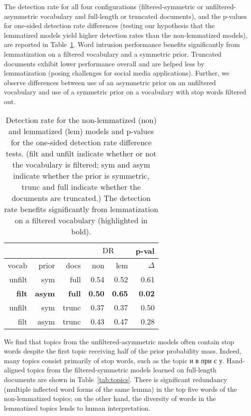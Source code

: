 \documentclass{clv2}
\newcommand{\DR}{\ensuremath{\textrm{DR}}}
\begin{document}
The detection rate for all four configurations (filtered-symmetric or unfiltered-asymmetric
vocabulary and full-length or truncated documents), and the
p-values for one-sided detection rate differences (testing our
hypothesis that the lemmatized models yield higher detection rates than
the non-lemmatized models), are reported in
Table~\ref{tab:detection-rate}.  Word intrusion performance benefits
significantly from lemmatization on a filtered vocabulary and a
symmetric prior.
Truncated documents exhibit lower
performance overall and are helped less by lemmatization (posing
challenges for social media applications).
Further, we observe differences
between use of an asymmetric prior on an unfiltered vocabulary and
use of a symmetric prior on a vocabulary with stop words filtered out.

\begin{table}
  \centering
    \begin{tabular}{rrr|rr|r}
              &              &                & \multicolumn{2}{|c|}{$\DR$} &       p-val   \\\hline
        vocab & prior        & docs           & non         & lem         &         $\Delta$ \\\hline
        unfilt & sym         & full           &          0.54 &          0.52 &          0.61 \\
        \textbf{filt} & \textbf{asym} & \textbf{full} & \textbf{0.50} & \textbf{0.65} & \textbf{0.02} \\
        unfilt & sym         & trunc          &          0.37 &          0.37 &          0.50 \\
        filt & asym          & trunc          &          0.43 &          0.47 &          0.28 \\
    \end{tabular}
    \caption{Detection rate for the non-lemmatized (non) and
        lemmatized (lem) models
        and p-values for the one-sided detection rate difference tests.
        (filt and unfilt indicate whether or not the vocabulary is
        filtered; sym and asym indicate whether the prior is symmetric,
        trunc and full indicate whether the documents are truncated.)
        The detection rate benefits significantly from lemmatization on
        a filtered vocabulary (highlighted in bold).}
    \label{tab:detection-rate}
\end{table}

We find that topics from the unfiltered-asymmetric models often contain
stop words despite the first topic receiving half of the prior
probability mass.  Indeed, many topics consist primarily of stop
words, such as the topic {и в при с у}.
Hand-aligned topics from the filtered-symmetric models learned on
full-length documents are shown in Table~\ref{tab:topics}.
There is significant redundancy (multiple inflected word forms of the
same lemma) in the top five words of the non-lemmatized topics; on the
other hand, the diversity of words in the lemmatized topics lends
to human interpretation.
\end{document}
